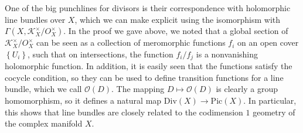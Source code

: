\documentclass[psamsfonts, 12pt]{amsart}
\theoremstyle{definition}
\theoremstyle{remark}
\renewcommand{\O}{\mathcal{O}}
\newcommand{\set}[1]{\left\lbrace #1 \right\rbrace}
\begin{document}
%
One of the big punchlines for divisors is their correspondence with holomorphic
line bundles over $X$, which we can make explicit using the isomorphism with
$\Gamma(X, \mathcal{K}^\times_X / O^\times_X)$. In the proof we gave above, we noted
that a global section of $\mathcal{K}^\times_X / O^\times_X$ can be seen as a collection
of meromorphic functions $f_i$ on an open cover $\set{U_i}$, such that on intersections,
the function $f_i/f_j$ is a nonvanishing holomorphic function. In addition, it is easily
seen that the functions satisfy the cocycle condition, so they can be used
to define transition functions for a line bundle, which we call $\O(D)$. The
mapping $D \mapsto \O(D)$ is clearly a group homomorphism, so it defines a natural
map $\mathrm{Div}(X) \to \mathrm{Pic}(X)$. In particular, this shows that line bundles
are closely related to the codimension $1$ geometry of the complex manifold $X$.
%
%
\end{document}
